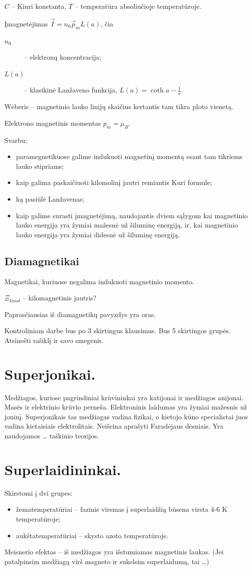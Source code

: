 $C$ – Kiuri konstanta,
$T$ – temperatūra absoliučioje temperatūroje.

Įmagnetėjimas $\vec{I} = n_{0}\vec{p}_{m}L(a)$, čia
\begin{description}
  \item[$n_{0}$] – elektronų koncentracija;
  \item[$L(a)$] – klasikinė Lanžaveno funkcija,
    $L(a) = \coth a - \frac{1}{a}$.
\end{description}

Wėberis – magnetinio lauko linijų skaičius kertantis tam tikra ploto
vienetą.

Elektrono magnetinis momentas $p_{m} = \mu_{B}$.

Svarbu:
\begin{itemize}
  \item paramegnetikuose galime indukuoti magnetinį momentą esant
    tam tikriems lauko stipriams;
  \item kaip galima paskaičiuoti kilomolinį jautri remiantis Kuri
    formule;
  \item ką pasiūlė Lanžavenas;
  \item kaip galime surasti įmagnetėjimą, naudojantis dviem sąlygom
    kai magnetinio lauko energija yra žymiai mažesnė už šiluminę
    energiją, ir, kai magnetinio lauko energija yra žymiai didesnė
    už šiluminę energiją.
\end{itemize}

\subsection{Diamagnetikai}

Magnetikai, kuriuose negalima indukuoti magnetinio momento.

$\Xi_{kmol}$ – kilomagnetinis jautris?

Paprasčiausias iš diamagnetikų pavyzdys yra oras.

Kontroliniam darbe bus po 3 skirtingus klausimus. Bus 5 skirtingos
grupės. Atsinešti rašiklį ir savo smegenis.

\section{Superjonikai.}
Medžiagos, kuriose pagrindiniai krūvininkai yra katijonai ir medžiagos
anijonai. Masės ir elektrinio krūvio perneša. Elektroninis laidumas yra
žymiai mažesnis už joninį. Superjonikais tas medžiagas vadina fizikai,
o kietojo kūno specialistai juos vadina kietaisiais elektrolitais.
Neišeina aprašyti Faradėjaus dėsniais. Yra naudojamos … taškinio teorijos.
\section{Superlaidininkai.}
Skirstomi į dvi grupes:
\begin{itemize}
  \item žematemperatūriai – fazinis virsmas į superlaidžią būsena virsta
    4-6 K temperatūroje;
  \item aukštatemperatūriai – skysto azoto temperatūroje.
\end{itemize}
Meisnerio efektas – iš medžiagos yra išstumiamas magnetinis laukas.
(Jei patalpinsim medžiagą virš magneto ir sukelsim superlaidumą,
tai …)

